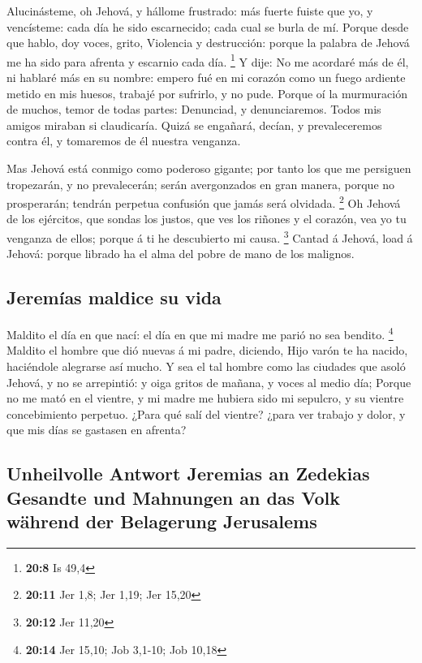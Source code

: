  Alucinásteme, oh Jehová, y hállome frustrado: más fuerte
fuiste que yo, y vencísteme: cada día he sido escarnecido; cada cual se
burla de mí.  Porque desde que hablo, doy voces, grito,
Violencia y destrucción: porque la palabra de Jehová me ha sido para
afrenta y escarnio cada día. \footnote{\textbf{20:8} Is 49,4}
 Y dije: No me acordaré más de él, ni hablaré más en su
nombre: empero fué en mi corazón como un fuego ardiente metido en mis
huesos, trabajé por sufrirlo, y no pude.  Porque oí la
murmuración de muchos, temor de todas partes: Denunciad, y
denunciaremos. Todos mis amigos miraban si claudicaría. Quizá se
engañará, decían, y prevaleceremos contra él, y tomaremos de él nuestra
venganza.

 Mas Jehová está conmigo como poderoso gigante; por tanto
los que me persiguen tropezarán, y no prevalecerán; serán avergonzados
en gran manera, porque no prosperarán; tendrán perpetua confusión que
jamás será olvidada. \footnote{\textbf{20:11} Jer 1,8; Jer 1,19; Jer
  15,20}  Oh Jehová de los ejércitos, que sondas los
justos, que ves los riñones y el corazón, vea yo tu venganza de ellos;
porque á ti he descubierto mi causa. \footnote{\textbf{20:12} Jer 11,20}
 Cantad á Jehová, load á Jehová: porque librado ha el
alma del pobre de mano de los malignos.

\hypertarget{jeremuxedas-maldice-su-vida}{%
\subsection{Jeremías maldice su
vida}\label{jeremuxedas-maldice-su-vida}}

 Maldito el día en que nací: el día en que mi madre me
parió no sea bendito. \footnote{\textbf{20:14} Jer 15,10; Job 3,1-10;
  Job 10,18}  Maldito el hombre que dió nuevas á mi
padre, diciendo, Hijo varón te ha nacido, haciéndole alegrarse así
mucho.  Y sea el tal hombre como las ciudades que asoló
Jehová, y no se arrepintió: y oiga gritos de mañana, y voces al medio
día;  Porque no me mató en el vientre, y mi madre me
hubiera sido mi sepulcro, y su vientre concebimiento perpetuo.
 ¿Para qué salí del vientre? ¿para ver trabajo y dolor, y
que mis días se gastasen en afrenta?

\hypertarget{unheilvolle-antwort-jeremias-an-zedekias-gesandte-und-mahnungen-an-das-volk-wuxe4hrend-der-belagerung-jerusalems}{%
\subsection{Unheilvolle Antwort Jeremias an Zedekias Gesandte und
Mahnungen an das Volk während der Belagerung
Jerusalems}\label{unheilvolle-antwort-jeremias-an-zedekias-gesandte-und-mahnungen-an-das-volk-wuxe4hrend-der-belagerung-jerusalems}}

